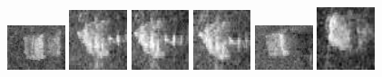 \begin{figure}
    \includegraphics[width=0.15\textwidth]{chapters/images/dataset/all-class-images/drinkCarton/drinkCarton-42.jpg}
    \includegraphics[width=0.15\textwidth]{chapters/images/dataset/all-class-images/drinkCarton/drinkCarton-282.jpg}
    \includegraphics[width=0.15\textwidth]{chapters/images/dataset/all-class-images/drinkCarton/drinkCarton-273.jpg}
    \includegraphics[width=0.15\textwidth]{chapters/images/dataset/all-class-images/drinkCarton/drinkCarton-320.jpg}
    \includegraphics[width=0.15\textwidth]{chapters/images/dataset/all-class-images/drinkCarton/drinkCarton-57.jpg}
    \includegraphics[width=0.15\textwidth]{chapters/images/dataset/all-class-images/drinkCarton/drinkCarton-20.jpg}
    

\end{figure}
